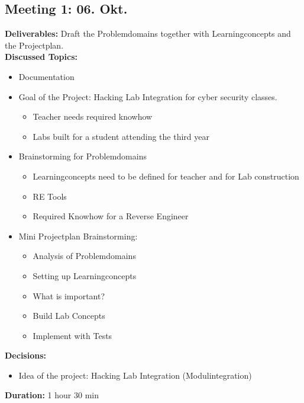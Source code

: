\subsection*{Meeting 1: 06. Okt.}
\textbf{Deliverables:} Draft the Problemdomains together with Learningconcepts and the Projectplan. \\
\textbf{Discussed Topics:} 
\begin{itemize}
    \item Documentation
    \item Goal of the Project: Hacking Lab Integration for cyber security classes.
    \begin{itemize}
        \item Teacher needs required knowhow
        \item Labs built for a student attending the third year
    \end{itemize}
    \item Brainstorming for Problemdomains
    \begin{itemize}
        \item Learningconcepts need to be defined for teacher and for Lab construction
        \item RE Tools
        \item Required Knowhow for a Reverse Engineer
    \end{itemize}
    \item Mini Projectplan Brainstorming:
    \begin{itemize}
        \item Analysis of Problemdomains
        \item Setting up Learningconcepts
        \item What is important?
        \item Build Lab Concepts
        \item Implement with Tests
    \end{itemize}
\end{itemize}
\textbf{Decisions:} 
\begin{itemize}
    \item Idea of the project: Hacking Lab Integration (Modulintegration)
\end{itemize}
\textbf{Duration:} 1 hour 30 min
